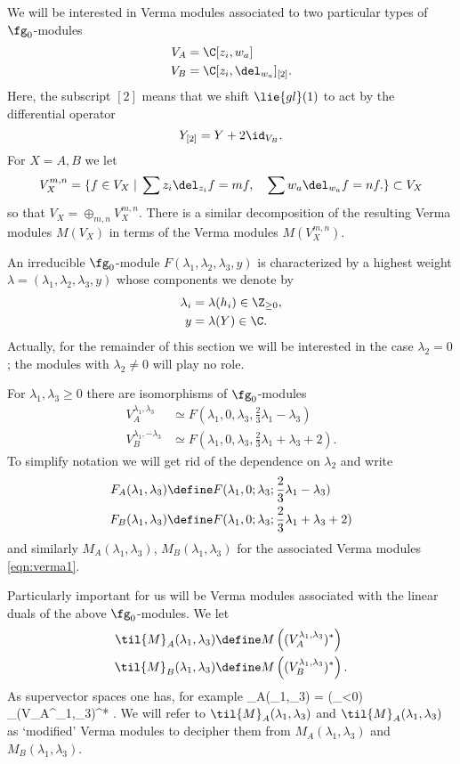 We will be interested in Verma modules associated to two particular types of $\fg_0$-modules
\begin{align*}
V_A & = \C[z_i, w_a] \\
V_B & = \C[z_i, \del_{w_a}]_{[2]} .
\end{align*}
Here, the subscript $[2]$ means that we shift $\lie{gl}(1)$ to act by the differential operator 
\[
Y_{[2]} = Y + 2 \id_{V_B} .
\]
For $X = A,B$ we let 
\[
V_X^{m,n} = \{f \in V_X \; | \; \sum z_i \del_{z_i} f = m f , \quad \sum w_a \del_{w_a} f = n f.\} \subset V_X
\]
so that $V_X = \oplus_{m,n} V_X^{m,n}$. 
There is a similar decomposition of the resulting Verma modules $M(V_X)$ in terms of the Verma modules $M(V_{X}^{m,n})$. 

An irreducible $\fg_0$-module $F(\lambda_1,\lambda_2,\lambda_3,y)$ is characterized by a highest weight $\lambda = (\lambda_1,\lambda_2,\lambda_3,y)$ whose components we denote by
\begin{align*}
\lambda_i & = \lambda (h_i) \in \Z_{\geq 0}, \\
 y & = \lambda(Y)\in \C . 
\end{align*}
Actually, for the remainder of this section we will be interested in the case $\lambda_2 = 0$; the modules with $\lambda_2 \ne 0$ will play no role.
 
For $\lambda_1,\lambda_3 \geq 0$ there are isomorphisms of $\fg_0$-modules
\begin{align*}
V_A^{\lambda_1,\lambda_3} & \simeq F(\lambda_1,0,\lambda_3,\frac23 \lambda_1 - \lambda_3) \\
V_B^{\lambda_1,-\lambda_3} & \simeq F(\lambda_1,0,\lambda_3,\frac23 \lambda_1 + \lambda_3 +2) .
\end{align*} 
To simplify notation we will get rid of the dependence on $\lambda_2$ and write 
\begin{align*}
F_A(\lambda_1,\lambda_3) & \define F(\lambda_1,0;\lambda_3;\frac23 \lambda_1 - \lambda_3) \\
F_B(\lambda_1,\lambda_3) & \define F(\lambda_1,0;\lambda_3;\frac23 \lambda_1 + \lambda_3 +2)  
\end{align*}
and similarly $M_A(\lambda_1,\lambda_3)$, $M_B(\lambda_1,\lambda_3)$ for the associated Verma modules \eqref{eqn:verma1}.

Particularly important for us will be Verma modules associated with the linear duals of the above $\fg_0$-modules.
We let 
\begin{align*}
\til{M}_A(\lambda_1,\lambda_3) &\define M \left( (V_A^{\lambda_1,\lambda_3})^* \right) \\
\til{M}_B(\lambda_1,\lambda_3) &\define M \left( (V_B^{\lambda_1,\lambda_3})^* \right) .
\end{align*}
As supervector spaces one has, for example
\beqn
{}_A(\lambda_1,\lambda_3) = \Sym(\fg_{<0}) \otimes_\C (V_A^{\lambda_1,\lambda_3})^* .
\eeqn
We will refer to $\til{M}_A(\lambda_1,\lambda_3)$ and $\til{M}_A (\lambda_1,\lambda_3)$ as `modified' Verma modules to decipher them from $M_A(\lambda_1,\lambda_3)$ and $M_B(\lambda_1,\lambda_3)$. 

